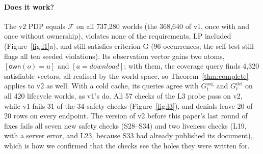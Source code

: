 \documentclass[sigconf,review,anonymous]{acmart}
\newcommand{\Gasg}{G^{\mathrm{asg}}}
\newcommand{\Gdel}{G^{\mathrm{del}}}
\begin{document}
\paragraph{Does it work?} The v2 PDP equals $\mathcal{F}$ on all 737{,}280 worlds (the 368{,}640 of v1, once
with and once without ownership), violates none of the requirements, LP included (Figure~\ref{fig:l1}a), and
still satisfies criterion G (96 occurrences; the self-test still flags all ten seeded violations). Its observation vector gains two atoms, $[\mathsf{own}(o)=u]$ and $[a=\mathit{download}]$; with them, the
coverage query finds 4{,}320 satisfiable vectors, all realised by the world space, so Theorem~\ref{thm:complete}
applies to v2 as well. With a cold cache, its queries agree with $\Gasg_t$ and $\Gdel_t$ on all 420 lifecycle
worlds, as v1's do. All 57 checks of the L3 probe pass on v2, while v1 fails 31 of the 34 safety checks
(Figure~\ref{fig:l3}), and denials leave 20 of 20 rows on every endpoint. The version of v2 before this paper's last
round of fixes fails all seven new safety checks (S28--S34) and two liveness checks (L19, with a server error,
and L23, because S33 had already published its document), which is how we confirmed that the checks see the holes
they were written for.
\end{document}

